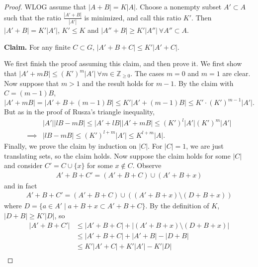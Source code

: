 \documentclass{article}
\theoremstyle{definition}
\begin{document}
\begin{proof}
    WLOG assume that $\left|A+B\right|=K\left|A\right|$. Choose a nonempty subset $A' \subset A$ such that the ratio $\frac{\left|A'+B\right|}{\left|A'\right|}$ is minimized, and call this ratio $K'$. Then $\left|A'+B\right|=K'\left|A'\right|$, $K'\le K$ and $\left|A''+B\right|\ge K'\left|A''\right| ~\forall A'' \subset A$.
    \vspace{1mm}
     
    \textbf{Claim.} For any finite $C \subset G$, $\left|A'+B+C\right|\le K'\left|A'+C\right|$.
    \vspace{1mm}
     
    We first finish the proof assuming this claim, and then prove it. We first show that $\left|A'+mB\right|\le (K')^m\left|A'\right| ~\forall m \in \mathbb{Z}_{\ge 0}$. The cases $m=0$ and $m=1$ are clear. Now suppose that $m>1$ and the result holds for $m-1$. By the claim with $C=(m-1)B$, \[
    \left|A' + mB\right| = \left|A'+B+(m-1)B\right| \le K'\left|A'+(m-1)B\right|\le K'\cdot (K')^{m-1}\left|A'\right|.
    \]
    But as in the proof of Rusza's triangle inequality, 
    \begin{align*}
        &\left|A'\right|\left|lB-mB\right| \le \left|A' + lB\right|\left|A'+mB\right| \le (K')^l \left|A'\right|(K')^m \left|A'\right|\\
        \implies & \left|lB-mB\right|\le (K')^{l+m}\left|A'\right|\le K^{l+m}\left|A\right|.
    \end{align*}
    Finally, we prove the claim by induction on $\left|C\right|$. For $\left|C\right|=1$, we are just translating sets, so the claim holds. Now suppose the claim holds for some $\left|C\right|$ and consider $C' = C \cup \{x\}$ for some $x \not\in C$. Observe 
    \begin{align*}
        A'+B+C' = (A' + B + C) \cup (A'+B+x)
    \end{align*}
    and in fact 
    \begin{align*}
        A'+B+C' = (A'+B+C) \cup ((A'+B+x) \setminus (D+B+x))
    \end{align*}
    where $D = \{a \in A' \mid a+B+x \subset A'+B+C\}$. By the definition of $K$, $\left|D+B\right|\ge K'\left|D\right|$, so 
    \begin{align*}
        \left|A'+B+C'\right| &\le \left|A'+B+C\right|+\left|(A'+B+x)\setminus (D+B+x)\right| \\
        &\le \left|A'+B+C\right| + \left|A'+B\right| - \left|D+B\right|\\
        &\le K'\left|A'+C\right| + K'\left|A'\right| - K'\left|D\right|\\

\end{align*}
\end{proof}
\end{document}

